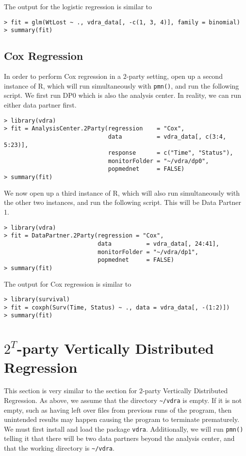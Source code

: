 \documentclass[12]{article}
\begin{document}
The output for the logistic regression is similar to 

\begin{verbatim}
> fit = glm(WtLost ~ ., vdra_data[, -c(1, 3, 4)], family = binomial)
> summary(fit)
\end{verbatim}


\subsection{Cox Regression}

In order to perform Cox regression in a $2$-party setting, open up a second instance of R, which will run simultaneously with \verb"pmn()", and run the following script.  We first run DP0 which is also the analysis center.  In reality, we can run either data partner first.

\begin{verbatim}
> library(vdra)
> fit = AnalysisCenter.2Party(regression    = "Cox",
                              data          = vdra_data[, c(3:4, 5:23)],
                              response      = c("Time", "Status"),
                              monitorFolder = "~/vdra/dp0",
                              popmednet     = FALSE)
> summary(fit)
\end{verbatim}

We now open up a third instance of R, which will also run simultaneously with the other two instances, and run the following script.  This will be Data Partner 1.

\begin{verbatim}
> library(vdra)
> fit = DataPartner.2Party(regression = "Cox",
                           data          = vdra_data[, 24:41],
                           monitorFolder = "~/vdra/dp1",
                           popmednet     = FALSE)
> summary(fit)
\end{verbatim}


The output for Cox regression is similar to 

\begin{verbatim}
> library(survival)
> fit = coxph(Surv(Time, Status) ~ ., data = vdra_data[, -(1:2)])
> summary(fit)            
\end{verbatim}

\section{$2^T$-party Vertically Distributed Regression}

This section is very similar to the section for $2$-party Vertically Distributed Regression.  As above, we assume that the directory \verb"~/vdra" is empty.  If it is not empty, such as having left over files from previous runs of the program, then unintended results may happen causing the program to terminate prematurely.  We must first install and load the package \verb"vdra".  Additionally, we will run \verb"pmn()" telling it that there will be two data partners beyond the analysis center, and that the working directory is \verb"~/vdra".
\end{document}
